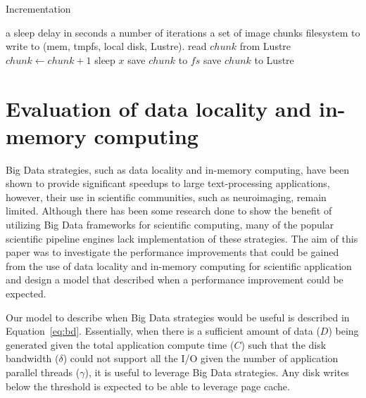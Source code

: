 \documentclass{report}
\newcommand{\Desc}[2]{\State \makebox[2em][l]{#1}#2}
\begin{document}
            \begin{algorithm}\caption{Incrementation}\label{alg:incrementation}
            \begin{algorithmic}[1]
            \Input
            \Desc{$x$}{a sleep delay in seconds}
            \Desc{$n$}{a number of iterations}
            \Desc{$C$}{a set of image chunks}
            \Desc{$fs$}{filesystem to write to (mem, tmpfs, local disk, Lustre).}
            \EndInput
            \State read $chunk$ from Lustre
                \State $chunk\gets chunk+1$
                \State sleep $x$
                \State save $chunk$ to $fs$
                \EndIf
            \EndFor
            \State save $chunk$ to Lustre
            \EndFor
        \end{algorithmic}
        \end{algorithm}
        
        \section{Evaluation of data locality and in-memory computing}\label{section:ccgrid2019}

        Big Data strategies, such as data locality and in-memory computing, have been shown 
        to provide significant speedups to large text-processing applications, however,
        their use in scientific communities, such as neuroimaging, remain limited. 
        Although there has been some research done to show the benefit of utilizing
        Big Data frameworks for scientific computing, many of the popular scientific
        pipeline engines lack implementation of these strategies. The aim of this paper
        was to investigate the performance improvements that could be gained
        from the use of data locality and in-memory computing for scientific application 
        and design a model that described when a performance improvement could be expected.
        

        Our model to describe when Big Data strategies would be useful is described in
        Equation~\ref{eq:bd}. Essentially, when there is a sufficient amount of data ($D$)
        being generated given the total application compute time ($C$) such that the disk
        bandwidth ($\delta$) could not support all the I/O given the number of
        application parallel threads ($\gamma$), it is useful to leverage Big Data strategies.
        Any disk writes below the threshold is expected to be able to leverage page cache.
\end{document}
